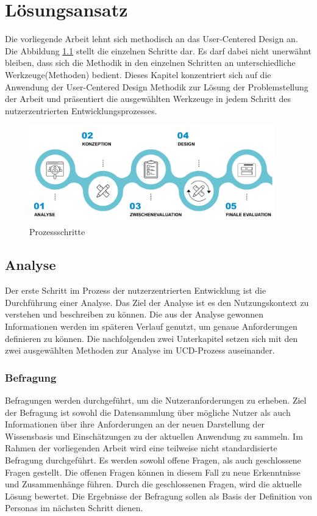 \chapter{Lösungsansatz}\label{ch:approach}
Die vorliegende Arbeit lehnt sich methodisch an das User-Centered Design an. 
Die Abbildung \ref{fig:approach} stellt die einzelnen Schritte dar.
Es darf dabei nicht unerwähnt bleiben, dass sich die Methodik in den einzelnen Schritten an unterschiedliche Werkzeuge(Methoden) bedient.
Dieses Kapitel konzentriert sich auf die Anwendung der User-Centered Design Methodik zur Lösung der Problemstellung der Arbeit und präsentiert die ausgewählten Werkzeuge in jedem Schritt des nutzerzentrierten Entwicklungsprozesses.

\begin{figure}[h]
	\centering
    	\includegraphics[width=0.95\textwidth]{Images/Ansatz}
   	\caption{Prozessschritte}
   	\label{fig:approach}
\end{figure}

\section{Analyse}

Der erste Schritt im Prozess der nutzerzentrierten Entwicklung ist die Durchführung einer Analyse.
Das Ziel der Analyse ist es den Nutzungskontext zu verstehen und beschreiben zu können.
Die aus der Analyse gewonnen Informationen werden im späteren Verlauf genutzt, um genaue Anforderungen definieren zu können.
Die nachfolgenden zwei Unterkapitel setzen sich mit den zwei ausgewählten Methoden zur Analyse im \ac{UCD}-Prozess auseinander.

\subsection{Befragung}\label{ch:interview}

Befragungen werden durchgeführt, um die Nutzeranforderungen zu erheben.
Ziel der Befragung ist sowohl die Datensammlung über mögliche Nutzer als auch Informationen über ihre Anforderungen an der neuen Darstellung der Wissensbasis und Einschätzungen zu der aktuellen Anwendung zu sammeln. 
Im Rahmen der vorliegenden Arbeit wird eine teilweise nicht standardisierte Befragung durchgeführt.
Es werden sowohl offene Fragen, als auch geschlossene Fragen gestellt.
Die offenen Fragen können in diesem Fall zu neue Erkenntnisse und Zusammenhänge führen.
Durch die geschlossenen Fragen, wird die aktuelle Lösung bewertet.
Die Ergebnisse der Befragung sollen als Basis der Definition von Personas im nächsten Schritt dienen.

